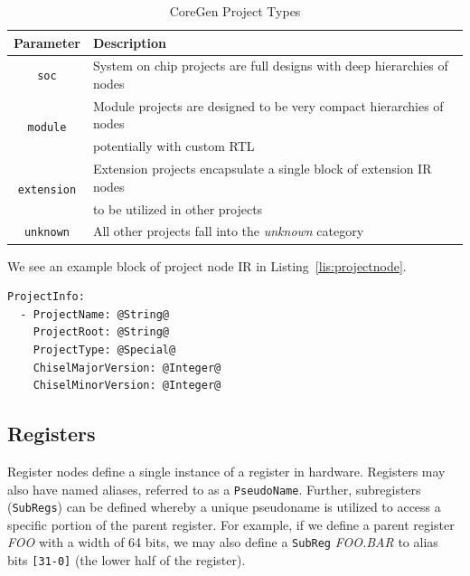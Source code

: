 \documentclass{article}
\begin{document}
\begin{table}[h]
\begin{center}
\caption{CoreGen Project Types}
\vspace{0.125in}
\label{tab:ProjTypes}
\begin{tabular}{|c|l|}
\hline
\textbf{Parameter} & \textbf{Description}\\
\hline
\texttt{soc} & System on chip projects are full designs with deep hierarchies of nodes\\
\hline
\multirow{2}{*}{\texttt{module}} & Module projects are designed to be very compact hierarchies of nodes\\
                                                       & potentially with custom RTL\\
\hline
\multirow{2}{*}{\texttt{extension}} & Extension projects encapsulate a single block of extension IR nodes\\
                                                           & to be utilized in other projects\\
\hline
\texttt{unknown} & All other projects fall into the \textit{unknown} category\\
\hline
\end{tabular}
\end{center}
\end{table} 

We see an example block of project node IR in Listing~\ref{lis:projectnode}.  

\vspace{0.125in}
\begin{lstlisting}[frame=single,style=base,caption={Project Node Definition},captionpos=b,label={lis:projectnode}]
ProjectInfo:
  - ProjectName: @String@
    ProjectRoot: @String@
    ProjectType: @Special@
    ChiselMajorVersion: @Integer@
    ChiselMinorVersion: @Integer@
\end{lstlisting} 

\clearpage
\subsection{Registers}
\label{sec:RegisterNodes}

Register nodes define a single instance of a register in hardware.  Registers may also have named aliases, referred 
to as a \texttt{PseudoName}.  Further, subregisters (\texttt{SubRegs}) can be defined whereby a unique pseudoname 
is utilized to access a specific portion of the parent register.  For example, if we define a parent register \textit{FOO} 
with a width of 64 bits, we may also define a \texttt{SubReg} \textit{FOO.BAR} to alias bits \texttt{[31-0]} (the lower 
half of the register).  
\end{document}
